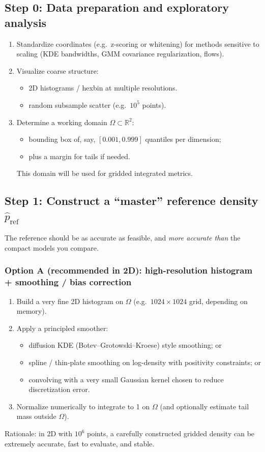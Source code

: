 \documentclass[twocolumn]{notes}
\begin{document}
\subsection{Step 0: Data preparation and exploratory analysis}
\begin{enumerate}[leftmargin=2em]
\item Standardize coordinates (e.g.\ z-scoring or whitening) for methods sensitive to scaling (KDE bandwidths, GMM covariance regularization, flows).
\item Visualize coarse structure:
  \begin{itemize}
  \item 2D histograms / hexbin at multiple resolutions.
  \item random subsample scatter (e.g.\ $10^5$ points).
  \end{itemize}
\item Determine a working domain $\Omega\subset\mathbb{R}^2$:
  \begin{itemize}
  \item bounding box of, say, $[0.001,0.999]$ quantiles per dimension;
  \item plus a margin for tails if needed.
  \end{itemize}
This domain will be used for gridded integrated metrics.
\end{enumerate}

\subsection{Step 1: Construct a ``master'' reference density $\hat p_{\mathrm{ref}}$}
The reference should be as accurate as feasible, and \emph{more accurate than} the compact models you compare.

\subsubsection{Option A (recommended in 2D): high-resolution histogram + smoothing / bias correction}
\begin{enumerate}[leftmargin=2em]
\item Build a very fine 2D histogram on $\Omega$ (e.g.\ $1024\times 1024$ grid, depending on memory).
\item Apply a principled smoother:
  \begin{itemize}
  \item diffusion KDE (Botev--Grotowski--Kroese) style smoothing; or
  \item spline / thin-plate smoothing on log-density with positivity constraints; or
  \item convolving with a very small Gaussian kernel chosen to reduce discretization error.
  \end{itemize}
\item Normalize numerically to integrate to 1 on $\Omega$ (and optionally estimate tail mass outside $\Omega$).
\end{enumerate}
Rationale: in 2D with $10^6$ points, a carefully constructed gridded density can be extremely accurate, fast to evaluate, and stable.
\end{document}
